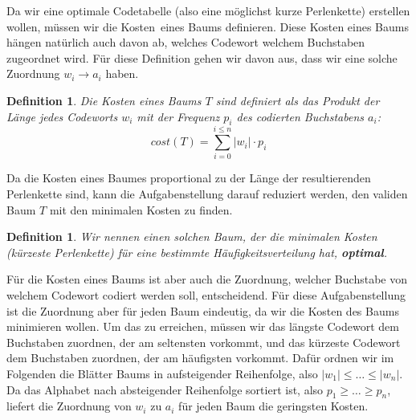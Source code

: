 \documentclass[a4paper,10pt,ngerman]{scrartcl}
\newtheorem{definition}[satz]{Definition}
\begin{document}
    Da wir eine optimale Codetabelle (also eine möglichst kurze Perlenkette) erstellen wollen, müssen wir die \glqq Kosten\grqq~eines Baums definieren.
    Diese Kosten eines Baums hängen natürlich auch davon ab, welches Codewort welchem Buchstaben zugeordnet wird. Für diese Definition gehen wir
    davon aus, dass wir eine solche Zuordnung $w_i \to a_i$ haben.
    \begin{definition}
        Die Kosten eines Baums $T$ sind definiert als das Produkt der Länge jedes Codeworts $w_i$ mit der Frequenz $p_i$ des codierten Buchstabens $a_i$: \[cost(T) = \sum_{i=0}^{i\le n} |w_i| \cdot p_i\]
    \end{definition}
    Da die Kosten eines Baumes proportional zu der Länge der resultierenden Perlenkette sind, kann die Aufgabenstellung darauf reduziert werden, den validen Baum $T$ mit den minimalen Kosten zu finden. \\
    \begin{definition}
        Wir nennen einen solchen Baum, der die minimalen Kosten (kürzeste Perlenkette) für eine bestimmte Häufigkeitsverteilung hat, \textbf{optimal}.
    \end{definition}
    Für die Kosten eines Baums ist aber auch die Zuordnung, welcher Buchstabe von welchem Codewort codiert werden soll, entscheidend.
    Für diese Aufgabenstellung ist die Zuordnung aber für jeden Baum eindeutig, da wir die Kosten des Baums minimieren wollen.
    Um das zu erreichen, müssen wir das längste Codewort dem Buchstaben zuordnen, der am seltensten vorkommt, und das kürzeste Codewort dem Buchstaben zuordnen, der am häufigsten vorkommt.
    Dafür ordnen wir im Folgenden die Blätter Baums in aufsteigender Reihenfolge, also $|w_1| \le \dots \le |w_n|$.
    Da das Alphabet nach absteigender Reihenfolge sortiert ist, also $p_1 \ge \dots \ge p_n$, liefert die Zuordnung von $w_i$ zu $a_i$ für jeden Baum die geringsten Kosten. \\
\end{document}
